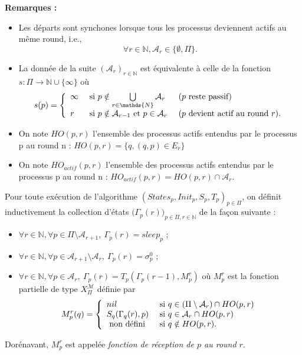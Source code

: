 \documentclass{article}
\begin{document}
\textbf{Remarques :}
\begin{itemize}
	\item Les départs sont synchones lorsque tous les processus deviennent actifs au même round, i.e.,
	$$ \forall r \in \mathds{N}, \mathcal{A}_r \in \{\emptyset, \Pi\}  . $$
	\item La donn\'ee de la suite $(\mathcal{A}_r)_{r \in \mathds{N}}$ est  équivalente \`a celle de la fonction 
	$s : \Pi \rightarrow \mathds{N} \cup \{\infty\}$ où 
	$$ s(p) = \left \{ \begin{array}{l ll}
	                          \infty & \mbox{ si  } p \notin \bigcup\limits_{r \in \mathds{N}}  \mathcal{A}_r &  \mbox { ($p$ reste passif) } \\
	                          r  & \mbox{ si  } p \notin \mathcal{A}_{r-1} \mbox{ et } p \in \mathcal{A}_{r}  & \mbox{ ($p$ devient actif au round $r$)}.
	                          \end{array} \right.$$ 
	\item On note $HO(p,r)$ l'ensemble des processus actifs entendus par le processus p au round n : $HO(p,r) = \{q, (q,p) \in E_r\}$
	\item On note $HO_{actif}(p,r)$ l'ensemble des processus actifs entendus par le processus p au round n : $HO_{actif}(p,r) = HO(p,r) \cap \mathcal{A}_r$.

\end{itemize}

Pour toute  exécution de l'algorithme  $(States_p, Init_p, S_p,T_p)_{p\in \Pi}$, on définit inductivement la collection 
	d'\'etats $ \big( \Gamma_p(r) \big )_{p\in\Pi, r\in \mathds{N}}$ de la fa\c{c}on suivante : 
	\begin{itemize}
		\item $\forall r \in \mathds{N},\forall p \in \Pi \setminus \mathcal{A}_{r+1}, \  \Gamma_p(r) = sleep_p$ ;
		\item $\forall r  \in \mathds{N},\forall p \in \mathcal{A}_{r+1} \setminus \mathcal{A}_r, \ \Gamma_p(r) = \sigma^0_p$ ;
		\item $\forall r  \in \mathds{N},\forall p \in \mathcal{A}_{r} , \  \Gamma_p(r) = T_p (\Gamma_p(r - 1) ,M_p^{r})$
			où $M_p^r$ est la fonction partielle de type $X_\Pi^\mathcal{M}$ définie par 
			$$ M_p^r(q) = \left \{ \begin{array}{l l}
	                         nil  & \mbox{ si  } q \in (\Pi \setminus \mathcal{A}_r  ) \cap  HO(p,r)  \\
	                         S_q (\Gamma_q(r), p)  & \mbox{ si  }   q \in \mathcal{A}_r  \cap  HO(p,r) \\
	                         \mbox{ non d\'efini  } & \mbox{ si  }   q \notin  HO(p,r) .
	                          \end{array} \right.$$ 
	\end{itemize}
Dorénavant, $M_p^r$ est appelée \emph{fonction de réception de $p$ au round $r$}.
\end{document}

